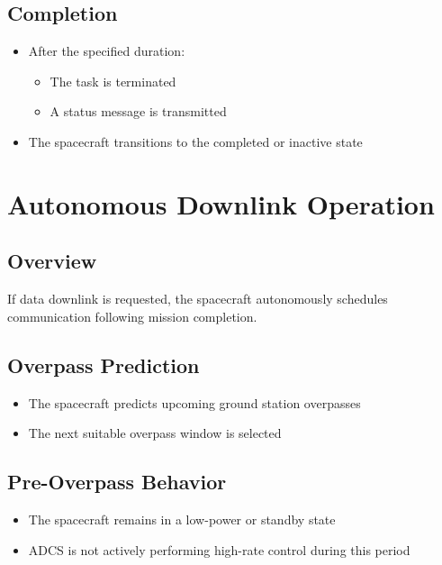\documentclass[letterpaper,11pt,oneside,english]{scrreprt}
\begin{document}
	\section{Completion}
	
	\begin{itemize}
		\item After the specified duration:
		\begin{itemize}
			\item The task is terminated
			\item A status message is transmitted
		\end{itemize}
		
		\item The spacecraft transitions to the completed or inactive state
	\end{itemize}
	
	\chapter{Autonomous Downlink Operation}
	
	\section{Overview}
	
	If data downlink is requested, the spacecraft autonomously schedules communication following mission completion.
	
	\section{Overpass Prediction}
	
	\begin{itemize}
		\item The spacecraft predicts upcoming ground station overpasses
		\item The next suitable overpass window is selected
	\end{itemize}
	
	\section{Pre-Overpass Behavior}
	
	\begin{itemize}
		\item The spacecraft remains in a low-power or standby state
		\item ADCS is not actively performing high-rate control during this period
	\end{itemize}
	
\end{document}
